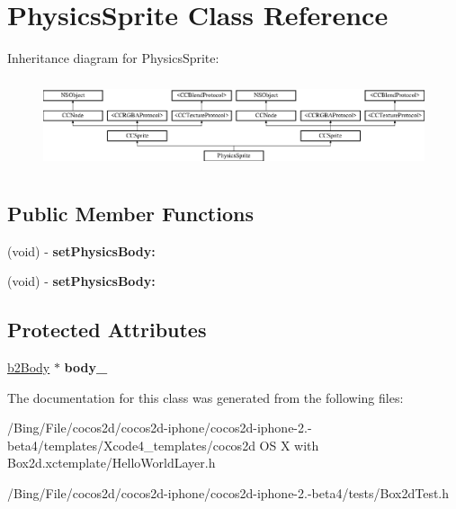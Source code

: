 \hypertarget{interface_physics_sprite}{\section{Physics\-Sprite Class Reference}
\label{interface_physics_sprite}
}
Inheritance diagram for Physics\-Sprite\-:\begin{figure}[H]
\begin{center}
\leavevmode
\includegraphics[height=2.647754cm]{interface_physics_sprite}
\end{center}
\end{figure}
\subsection*{Public Member Functions}
\begin{DoxyCompactItemize}
\item 
\hypertarget{interface_physics_sprite_a853b9462e896123262409338f932b76a}{(void) -\/ {\bfseries set\-Physics\-Body\-:}}\label{interface_physics_sprite_a853b9462e896123262409338f932b76a}

\item 
\hypertarget{interface_physics_sprite_a853b9462e896123262409338f932b76a}{(void) -\/ {\bfseries set\-Physics\-Body\-:}}\label{interface_physics_sprite_a853b9462e896123262409338f932b76a}

\end{DoxyCompactItemize}
\subsection*{Protected Attributes}
\begin{DoxyCompactItemize}
\item 
\hypertarget{interface_physics_sprite_aa072bf12b86ee3501b2c177055d910a0}{\hyperlink{classb2_body}{b2\-Body} $\ast$ {\bfseries body\-\_\-}}\label{interface_physics_sprite_aa072bf12b86ee3501b2c177055d910a0}

\end{DoxyCompactItemize}


The documentation for this class was generated from the following files\-:\begin{DoxyCompactItemize}
\item 
/\-Bing/\-File/cocos2d/cocos2d-\/iphone/cocos2d-\/iphone-\/2.-\/beta4/templates/\-Xcode4\-\_\-templates/cocos2d O\-S X with Box2d.\-xctemplate/Hello\-World\-Layer.\-h\item 
/\-Bing/\-File/cocos2d/cocos2d-\/iphone/cocos2d-\/iphone-\/2.-\/beta4/tests/Box2d\-Test.\-h\end{DoxyCompactItemize}
